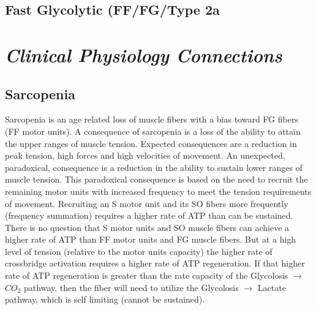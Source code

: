 \subsection{Fast Glycolytic (FF/FG/Type 2a}




\section{\textit{Clinical Physiology Connections}}

\subsection{Sarcopenia}

Sarcopenia is an age related loss of muscle fibers with a bias toward FG fibers (FF motor units). A consequence of sarcopenia is a loss of the ability to attain the upper ranges of muscle tension. Expected consequences are a reduction in peak tension, high forces and high velocities of movement. An unexpected, paradoxical, consequence is a reduction in the ability to sustain lower ranges of muscle tension. This paradoxical consequence is based on the need to recruit the remaining motor units with increased frequency to meet the tension requirements of movement. Recruiting an S motor unit and its SO fibers more frequently (frequency summation) requires a higher rate of ATP than can be sustained. There is no question that S motor units and SO muscle fibers can achieve a higher rate of ATP than FF motor units and FG muscle fibers. But at a high level of tension (relative to the motor units capacity) the higher rate of crossbridge activation requires a higher rate of ATP regeneration. If that higher rate of ATP regeneration is greater than the rate capacity of the Glycolosis $\rightarrow$ $CO_2$ pathway, then the fiber will need to utilize the Glycolosis $\rightarrow$ Lactate pathway, which is self limiting (cannot be sustained). 

